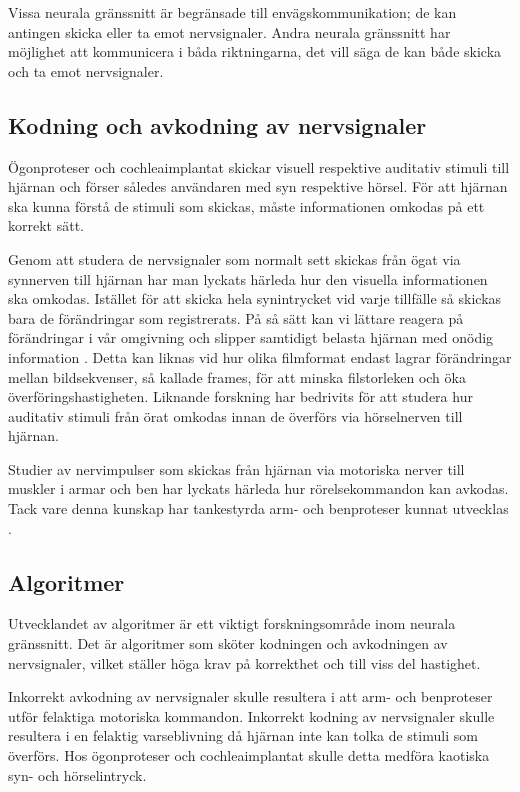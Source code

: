 \documentclass[12pt, a4paper]{article}
\begin{document}
Vissa neurala gränssnitt är begränsade till envägskommunikation; de kan antingen
skicka eller ta emot nervsignaler. Andra neurala gränssnitt har möjlighet att
kommunicera i båda riktningarna, det vill säga de kan både skicka och ta emot
nervsignaler.

\subsection{Kodning och avkodning av nervsignaler}
\label{enc_dec}

Ögonproteser \cite{sight2} och cochleaimplantat \cite{sound} skickar visuell
respektive auditativ stimuli till hjärnan och förser således användaren med syn
respektive hörsel. För att hjärnan ska kunna förstå de stimuli som skickas,
måste informationen omkodas på ett korrekt sätt.

Genom att studera de nervsignaler som normalt sett skickas från ögat via
synnerven till hjärnan har man lyckats härleda hur den visuella informationen
ska omkodas. Istället för att skicka hela synintrycket vid varje tillfälle så
skickas bara de förändringar som registrerats. På så sätt kan vi lättare reagera
på förändringar i vår omgivning och slipper samtidigt belasta hjärnan med onödig
information \cite{sight1}. Detta kan liknas vid hur olika filmformat endast
lagrar förändringar mellan bildsekvenser, så kallade frames, för att minska
filstorleken och öka överföringshastigheten. Liknande forskning har bedrivits
för att studera hur auditativ stimuli från örat omkodas innan de överförs via
hörselnerven till hjärnan.

Studier av nervimpulser som skickas från hjärnan via motoriska nerver till
muskler i armar och ben har lyckats härleda hur rörelsekommandon kan avkodas.
Tack vare denna kunskap har tankestyrda arm- och benproteser kunnat utvecklas
\cite{prosthetic_operation}.

\subsection{Algoritmer}


Utvecklandet av algoritmer är ett viktigt forskningsområde inom neurala
gränssnitt. Det är algoritmer som sköter kodningen och avkodningen av
nervsignaler, vilket ställer höga krav på korrekthet och till viss del
hastighet.

Inkorrekt avkodning av nervsignaler skulle resultera i att arm- och benproteser
utför felaktiga motoriska kommandon. Inkorrekt kodning av nervsignaler skulle
resultera i en felaktig varseblivning då hjärnan inte kan tolka de stimuli som
överförs. Hos ögonproteser och cochleaimplantat skulle detta medföra kaotiska
syn- och hörselintryck.
\end{document}
